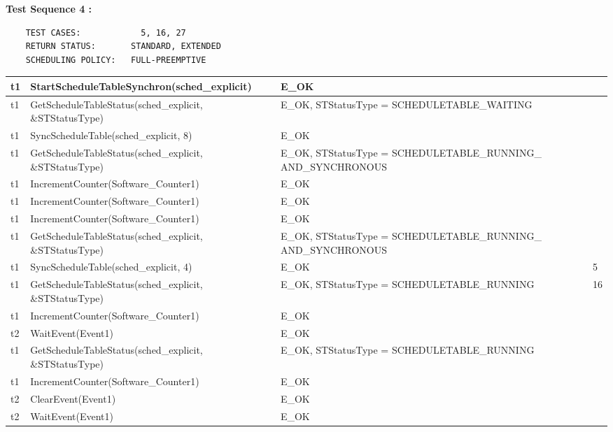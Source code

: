 \documentclass[10pt]{article}
\newlength{\Li}\settowidth{\Li}{Running}
\newlength{\Lii}\setlength{\Lii}{7cm}
\newlength{\Liiii}\setlength{\Liiii}{0.9cm}
\newlength{\Liii}\setlength{\Liii}{\textwidth} \addtolength{\Liii}{-\Li} \addtolength{\Liii}{-\Lii} \addtolength{\Liii}{-\Liiii}
\begin{document}
	\textbf{Test Sequence 4 :}
	\begin{lstlisting}
	TEST CASES:		       5, 16, 27
	RETURN STATUS:	  	 STANDARD, EXTENDED
	SCHEDULING POLICY:   FULL-PREEMPTIVE
	\end{lstlisting}
	
	
	\begin{supertabular}{|p{\Li}|p{\Lii}|p{\Liii}|p{\Liiii}|} \hline 
	t1		& StartScheduleTableSynchron(sched\_explicit)					& E\_OK																	& \\ \hline
	t1		& GetScheduleTableStatus(sched\_explicit, \&STStatusType)			& E\_OK, STStatusType = SCHEDULETABLE\_WAITING								& \\ \hline
	t1		& SyncScheduleTable(sched\_explicit, 8)							& E\_OK																	& \\ \hline
	t1		& GetScheduleTableStatus(sched\_explicit, \&STStatusType)			& E\_OK, STStatusType = SCHEDULETABLE\_RUNNING\_ AND\_SYNCHRONOUS		& \\ \hline
	t1		& IncrementCounter(Software\_Counter1)						& E\_OK																	& \\ \hline
	t1		& IncrementCounter(Software\_Counter1)						& E\_OK																	& \\ \hline
	t1		& IncrementCounter(Software\_Counter1)						& E\_OK																	& \\ \hline
	t1		& GetScheduleTableStatus(sched\_explicit, \&STStatusType)			& E\_OK, STStatusType = SCHEDULETABLE\_RUNNING\_ AND\_SYNCHRONOUS		& \\ \hline
	t1		& SyncScheduleTable(sched\_explicit, 4)							& E\_OK																	& 5 \\ \hline
	t1		& GetScheduleTableStatus(sched\_explicit, \&STStatusType)			& E\_OK, STStatusType = SCHEDULETABLE\_RUNNING 							& 16 \\ \hline
	t1		& IncrementCounter(Software\_Counter1)						& E\_OK																	& \\ \hline
	t2		& WaitEvent(Event1)											& E\_OK																	& \\ \hline
	t1		& GetScheduleTableStatus(sched\_explicit, \&STStatusType)			& E\_OK, STStatusType = SCHEDULETABLE\_RUNNING 							& \\ \hline
	t1		& IncrementCounter(Software\_Counter1)						& E\_OK																	& \\ \hline
	t2		& ClearEvent(Event1)										& E\_OK																	& \\ \hline
	t2		& WaitEvent(Event1)											& E\_OK																	& \\ \hline

\end{supertabular}
\end{document}
